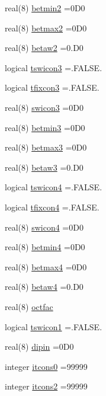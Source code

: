 \begin{DoxyCompactItemize}
real(8) \hyperlink{namespaceconstr_a36044d647f87781b963f69603cbf8d81}{betmin2} =0\+D0
\item 
real(8) \hyperlink{namespaceconstr_aa1746615301e6c7db864892b4a4efcae}{betmax2} =0\+D0
\item 
real(8) \hyperlink{namespaceconstr_add6480c3e1f2dfa1411754faf59a988f}{betaw2} =0.\+D0
\item 
logical \hyperlink{namespaceconstr_ae840dc6cddba77231ae81c49cb9dd28f}{tswicon3} =.F\+A\+L\+S\+E.
\item 
logical \hyperlink{namespaceconstr_ad17bca6891f805ef6cc0596067dfd473}{tfixcon3} =.F\+A\+L\+S\+E.
\item 
real(8) \hyperlink{namespaceconstr_ae14b0fb5921536040dba512c7afc82fb}{swicon3} =0\+D0
\item 
real(8) \hyperlink{namespaceconstr_a06b6dd91134ff376e8cff0d3bc21d6e2}{betmin3} =0\+D0
\item 
real(8) \hyperlink{namespaceconstr_abb4b139e7e590c9745b1c81dc1f2ea63}{betmax3} =0\+D0
\item 
real(8) \hyperlink{namespaceconstr_a6c448dea7ffa364b53159d44dab6caaf}{betaw3} =0.\+D0
\item 
logical \hyperlink{namespaceconstr_a3625f889e5dc6a042f3200449baa08fd}{tswicon4} =.F\+A\+L\+S\+E.
\item 
logical \hyperlink{namespaceconstr_a92c73883617275646fba95ec0731601e}{tfixcon4} =.F\+A\+L\+S\+E.
\item 
real(8) \hyperlink{namespaceconstr_aa5697aee92cd101480fe1d582d420289}{swicon4} =0\+D0
\item 
real(8) \hyperlink{namespaceconstr_a31827347e570a426bd60373f2ef8c219}{betmin4} =0\+D0
\item 
real(8) \hyperlink{namespaceconstr_a97294754aa9f8b191ccfc286e1368c33}{betmax4} =0\+D0
\item 
real(8) \hyperlink{namespaceconstr_a714dc0ad37c80c778012223401f2f890}{betaw4} =0.\+D0
\item 
real(8) \hyperlink{namespaceconstr_ac9a89b946b5604c6179d3be893ab8809}{octfac}
\item 
logical \hyperlink{namespaceconstr_a846dedd280a36badad283ce9ad5e8ff0}{tswicon1} =.F\+A\+L\+S\+E.
\item 
real(8) \hyperlink{namespaceconstr_a887fcb22bdc9514af569e050617e5520}{dipin} =0\+D0
\item 
integer \hyperlink{namespaceconstr_a3d32b892a876bc95ceb84d5fd4a08d73}{itcons0} =99999
\item 
integer \hyperlink{namespaceconstr_a30f4c618301cfa861b28f20f3c5cb81d}{itcons2} =99999

\end{DoxyCompactItemize}

